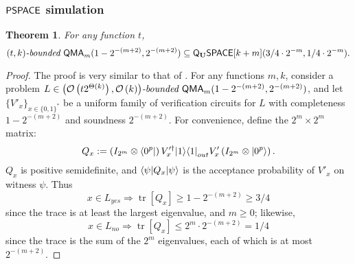 \documentclass[11pt]{article}
\newtheorem{theorem}{Theorem}
\theoremstyle{definition}
\theoremstyle{remark}
\newcommand\QMA{{\sf{QMA}}}
\newcommand\PSPACE{{\sf{PSPACE}}}
\newcommand\bddQMA[5]{{\left(#1,#2\right)}\textit{-bounded }\QMA_{#3}(#4,#5)}
\newcommand{\classfont}{\sf}
\newcommand{\Unitary}{\mathbf{U}}
\newcommand{\unitaryQSPACE}[3]{{\classfont{Q}_\Unitary\classfont{SPACE}}[#1](#2,#3)}
\DeclareMathOperator{\tr}{tr}
\begin{document}
\subsubsection{$\PSPACE$ simulation}
\begin{theorem} \label{thm:pqpspace simulation} For any function $t$,
\[
\bddQMA{t}{k}{m}{1-2^{-(m+2)}}{2^{-(m+2)}}\subseteq
\unitaryQSPACE{k+m}{3/4\cdot 2^{-m}}{1/4 \cdot 2^{-m}}.
\]
\end{theorem}
\begin{proof}
The proof is very similar to that of \cite[Theorem 3.6]{mw05}. For any functions $m, k$, consider a problem $L\in\bddQMA{\mathcal{O}\left(t2^{\Theta(k)}\right)}{\mathcal{O}\left(k\right)}{m}{1-2^{-(m+2)}}{2^{-(m+2)}}$, and let $\{V'_x\}_{x\in\{0,1\}^*}$ be a uniform family of verification circuits for $L$ with completeness $1-2^{-(m+2)}$ and soundness $2^{-(m+2)}$. 
For convenience, define the $2^m \times 2^m$ matrix:
\begin{equation}
Q_x := \left(I_{2^m}\otimes {\left\langle{0^p}\right\vert}\right) V'^\dagger_x {\left\vert{1}\right\rangle}{\left\langle{1}\right\vert}_{out} V'_x \left(I_{2^m}\otimes {\left\vert{0^p}\right\rangle}\right).
\end{equation}
$Q_x$ is positive semidefinite, and ${\left\langle{\psi}\right\vert}Q_x{\left\vert{\psi}\right\rangle}$ is the acceptance probability of $V'_x$ on witness $\psi$. Thus
\begin{equation}
x\in L_{yes} \Rightarrow \tr[Q_x]\ge 1 - 2^{-(m+2)} \ge 3/4
\end{equation}
since the trace is at least the largest eigenvalue, and $m\geq 0$; likewise,
\begin{equation}
x\in L_{no} \Rightarrow \tr[Q_x]\le 2^m \cdot 2^{-(m+2)} = 1/4
\end{equation}
since the trace is the sum of the $2^m$ eigenvalues, each of which is at most $2^{-(m+2)}$. 


\end{proof}
\end{document}
